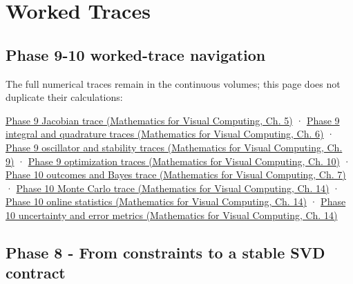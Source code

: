 \hypertarget{appendix-92ff77d4dfdc}{}\label{referencestart:appendix-92ff77d4dfdc}
\section{Worked Traces}\label{appendix-92ff77d4dfdc-worked-traces}

\subsection{Phase 9-10 worked-trace navigation}\label{appendix-92ff77d4dfdc-phase-9-10-worked-trace-navigation}

The full numerical traces remain in the continuous volumes; this page does not duplicate their calculations:

\href{../02-Mathematics-for-Visual-Computing/main.pdf\#nameddest=02-foundations-ii-ch021-jacobians-curvature-and-local-approximation}{Phase 9 Jacobian trace (Mathematics for Visual Computing, Ch. 5)} · \href{../02-Mathematics-for-Visual-Computing/main.pdf\#nameddest=02-foundations-ii-ch022-integration-and-quadrature}{Phase 9 integral and quadrature traces (Mathematics for Visual Computing, Ch. 6)} · \href{../02-Mathematics-for-Visual-Computing/main.pdf\#nameddest=02-foundations-ii-ch025-odes-and-numerical-simulation}{Phase 9 oscillator and stability traces (Mathematics for Visual Computing, Ch. 9)} · \href{../02-Mathematics-for-Visual-Computing/main.pdf\#nameddest=02-foundations-ii-ch026-optimization-and-inverse-problems}{Phase 9 optimization traces (Mathematics for Visual Computing, Ch. 10)} · \href{../02-Mathematics-for-Visual-Computing/main.pdf\#nameddest=02-foundations-ii-ch023-a-probability-model-begins-with-possible-outcomes}{Phase 10 outcomes and Bayes trace (Mathematics for Visual Computing, Ch. 7)} · \href{../02-Mathematics-for-Visual-Computing/main.pdf\#nameddest=02-foundations-ii-ch030-monte-carlo-estimates-trade-computation-for-uncertainty}{Phase 10 Monte Carlo trace (Mathematics for Visual Computing, Ch. 14)} · \href{../02-Mathematics-for-Visual-Computing/main.pdf\#nameddest=02-foundations-ii-ch030-finite-samples-need-stable-descriptive-statistics}{Phase 10 online statistics (Mathematics for Visual Computing, Ch. 14)} · \href{../02-Mathematics-for-Visual-Computing/main.pdf\#nameddest=02-foundations-ii-ch030-inference-and-error-metrics-need-explicit-assumptions}{Phase 10 uncertainty and error metrics (Mathematics for Visual Computing, Ch. 14)}

\subsection{Phase 8 - From constraints to a stable SVD contract}\label{appendix-92ff77d4dfdc-phase-8---from-constraints-to-a-stable-svd-contract}

